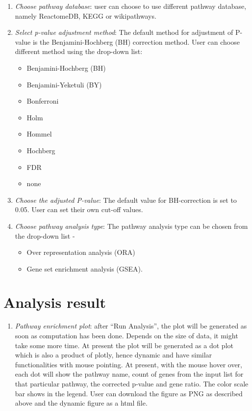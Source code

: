 \documentclass[
  a4paper,
  oneside,
  open=any]{scrreport}
\providecommand{\tightlist}{%
  \setlength{\itemsep}{0pt}\setlength{\parskip}{0pt}}\usepackage{longtable,booktabs,array}
\begin{document}
\begin{enumerate}
\def\labelenumi{\arabic{enumi}.}
\setcounter{enumi}{2}
\item
  \emph{Choose pathway database}: user can choose to use different
  pathway database, namely ReactomeDB, KEGG or wikipathways.
\item
  \emph{Select p-value adjustment method}: The default method for
  adjustment of P-value is the Benjamini-Hochberg (BH) correction
  method. User can choose different method using the drop-down list:

  \begin{itemize}
  \tightlist
  \item
    Benjamini-Hochberg (BH)
  \item
    Benjamini-Yeketuli (BY)
  \item
    Bonferroni
  \item
    Holm
  \item
    Hommel
  \item
    Hochberg
  \item
    FDR
  \item
    none
  \end{itemize}
\item
  \emph{Choose the adjusted P-value}: The default value for
  BH-correction is set to 0.05. User can set their own cut-off values.
\item
  \emph{Choose pathway analysis type}: The pathway analysis type can be
  chosen from the drop-down list -

  \begin{itemize}
  \tightlist
  \item
    Over representation analysis (ORA)
  \item
    Gene set enrichment analysis (GSEA).
  \end{itemize}
\end{enumerate}

\hypertarget{analysis-result-5}{%
\section{Analysis result}\label{analysis-result-5}}

\begin{enumerate}
\def\labelenumi{\arabic{enumi}.}
\tightlist
\item
  \emph{Pathway enrichment plot}: after ``Run Analysis'', the plot will
  be generated as soon as computation has been done. Depends on the size
  of data, it might take some more time. At present the plot will be
  generated as a dot plot which is also a product of plotly, hence
  dynamic and have similar functionalities with mouse pointing. At
  present, with the mouse hover over, each dot will show the pathway
  name, count of genes from the input list for that particular pathway,
  the corrected p-value and gene ratio. The color scale bar shows in the
  legend. User can download the figure as PNG as described above and the
  dynamic figure as a html file.\\
\end{enumerate}
\end{document}
